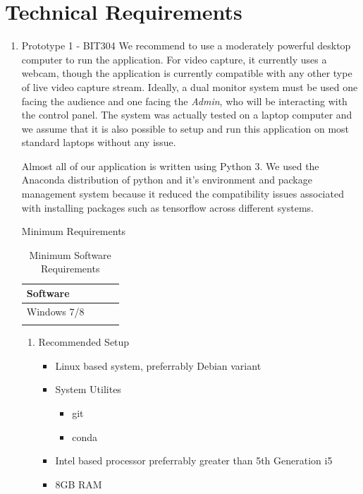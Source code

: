 \documentclass[12pt,a4paper,man]{report}
\begin{document}
\section{Technical Requirements}
\label{sec:org9178e88}
\begin{enumerate}
\item Prototype 1 - BIT304
\label{sec:orgf42c32a}
We recommend to use a moderately powerful desktop computer to run the application. For video capture, it currently uses a webcam, though the application is currently compatible with any other type of live video capture stream. Ideally, a dual monitor system must be used one facing the audience and one facing the \emph{Admin}, who will be interacting with the control panel. The system was actually tested on a laptop computer and we assume that it is also possible to setup and run this application on most standard laptops without any issue. 

Almost all of our application is written using Python 3. We used the Anaconda distribution of python and it's environment and package management system because it reduced the compatibility issues associated with installing packages such as tensorflow across different systems. 

Minimum Requirements

\begin{table}[htbp]
\caption{\label{table:minreq1}
Minimum Software Requirements}
\centering
\begin{tabular}{|l|l|lp{3cm}|}
Software\\
\hline
Windows 7/8\\
\\
\end{tabular}
\end{table}

\begin{enumerate}
\item Recommended Setup
\label{sec:org837c7f6}
\begin{itemize}
\item Linux based system, preferrably Debian variant
\item System Utilites
\begin{itemize}
\item git
\item conda
\end{itemize}
\item Intel based processor preferrably greater than 5th Generation i5
\item 8GB RAM
\end{itemize}
\end{enumerate}
\end{enumerate}
\end{document}
